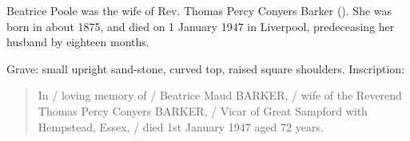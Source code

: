
Beatrice Poole was the wife of Rev. Thomas Percy Conyers Barker ().
She was born in about 1875, and died on 1 January 1947 in Liverpool, predeceasing her husband by eighteen months.

Grave: small upright sand-stone, curved top, raised square shoulders.\cite{ToxtethParkCemeteryInscriptions} Inscription:
\begin{quotation}
In / loving memory of / Beatrice Maud BARKER, / wife of the Reverend Thomas Percy Conyers BARKER, / Vicar of Great Sampford with Hempstead, Essex, / died 1st January 1947 aged 72 years.
\end{quotation}

% 
% 
% 
% 
% 
% 
% 
%  	 	 	 	 	 	 	 	 	 	 	 
% 
% 
